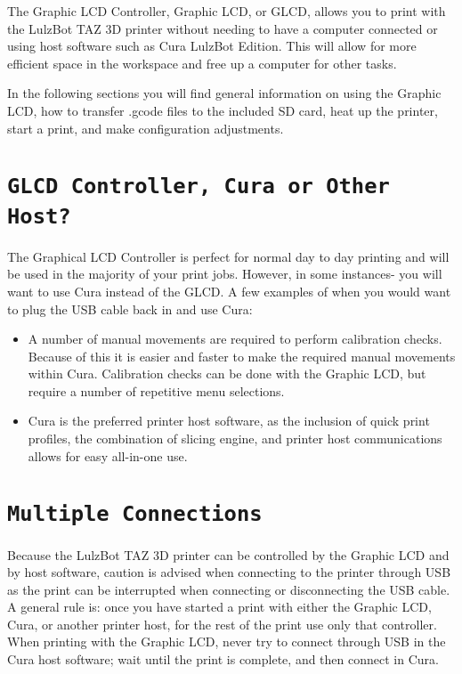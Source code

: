 %
%
%
%
%

The Graphic LCD Controller, Graphic LCD, or GLCD, allows you to print with the LulzBot TAZ 3D printer without needing to have a computer connected or using host software such as Cura LulzBot Edition. This will allow for more efficient space in the workspace and free up a computer for other tasks.

In the following sections you will find general information on using the Graphic LCD, how to transfer .gcode files to the included SD card, heat up the printer, start a print, and make configuration adjustments.

\section{\texttt{GLCD Controller, Cura or Other Host?}}
\label{sec:Graphic LCD, Cura or Other Host?}
The Graphical LCD Controller is perfect for normal day to day printing and will be used in the majority of your print jobs. However, in some instances- you will want to use Cura instead of the GLCD. A few examples of when you would want to plug the USB cable back in and use Cura:
\begin{itemize}
	\item A number of manual movements are required to perform calibration checks. Because of this it is easier and faster to make the required manual movements within Cura. Calibration checks can be done with the Graphic LCD, but require a number of repetitive menu selections. 
	\item Cura is the preferred printer host software, as the inclusion of quick print profiles, the combination of slicing engine, and printer host communications allows for easy all-in-one use.
\end{itemize}

\section{\texttt{Multiple Connections}}
Because the LulzBot TAZ 3D printer can be controlled by the Graphic LCD and by host software, caution is advised when connecting to the printer through USB as the print can be interrupted when connecting or disconnecting the USB cable. A general rule is: once you have started a print with either the Graphic LCD, Cura, or another printer host, for the rest of the print use only that controller. When printing with the Graphic LCD, never try to connect through USB in the Cura host software; wait until the print is complete, and then connect in Cura.

